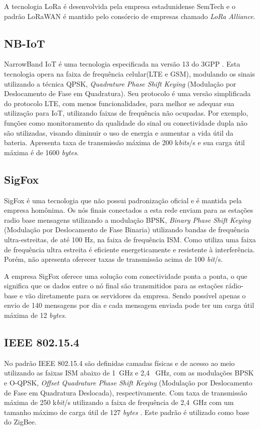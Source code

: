 A tecnologia LoRa é desenvolvida pela empresa estadunidense SemTech e o padrão LoRaWAN é mantido pelo consórcio de empresas chamado \emph{LoRa Alliance}.

\subsection{NB-IoT}
NarrowBand IoT é uma tecnologia especificada na versão 13 do 3GPP \cite{nbIoT}. Esta tecnologia opera na faixa de frequência celular(LTE e GSM), modulando os sinais utilizando a técnica QPSK, \emph{Quadrature Phase Shift Keying} (Modulação por Deslocamento de Fase em Quadratura). Seu protocolo é uma versão simplificada do protocolo LTE, com menos funcionalidades, para melhor se adequar sua utilização para IoT, utilizando faixas de frequência não ocupadas. Por exemplo, funções como monitoramento da qualidade do sinal ou conectividade dupla não são utilizadas, visando diminuir o uso de energia e aumentar a vida útil da bateria. Apresenta taxa de transmissão máxima de 200 k\emph{bits}/s e sua carga útil máxima é de 1600 \emph{bytes}.

\subsection{SigFox}
SigFox é uma tecnologia que não possui padronização oficial e é mantida pela empresa homônima. Os nós finais conectados a esta rede enviam para as estações radio base mensagens utilizando a modulação BPSK, \emph{Binary Phase Shift Keying} (Modulação por Deslocamento de Fase Binaria) utilizando bandas de frequência ultra-estreitas, de até 100 Hz, na faixa de frequência ISM. Como utiliza uma faixa de frequência ultra estreita é eficiente energeticamente e resistente à interferência. Porém, não apresenta oferecer taxas de transmissão acima de 100 \emph{bit}/s.

A empresa SigFox oferece uma solução com conectividade ponta a ponta, o que significa que os dados entre o nó final são transmitidos para as estações rádio-base e vão diretamente para os servidores da empresa. Sendo possível apenas o envio de 140 mensagens por dia e cada mensagem enviada pode ter um carga útil máxima de 12 \emph{bytes}.

\subsection{IEEE 802.15.4}
No padrão IEEE 802.15.4 são definidas camadas físicas e de acesso ao meio utilizando as faixas ISM abaixo de 1~GHz e 2,4 ~GHz, com as modulações BPSK e O-QPSK, \emph{Offset Quadrature Phase Shift Keying} (Modulação por Deslocamento de Fase em Quadratura Deslocada), respectivamente. Com taxa de transmissão máxima de 250 k\emph{bit}/s utilizando a faixa de frequência de 2,4~GHz com um tamanho máximo de carga útil de 127 \emph{bytes} \cite{munoz2018overview} \cite{gomes2017estimaccao}. Este padrão é utilizado como base do ZigBee.


